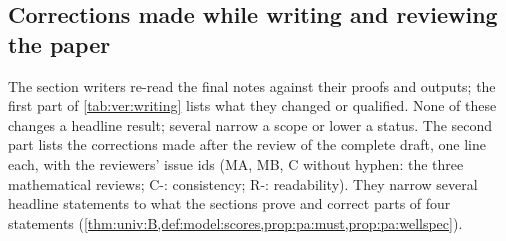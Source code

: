 \subsection{Corrections made while writing and reviewing the paper}\label{app:ver:writing}

The section writers re-read the final notes against their proofs and outputs; the first part of \cref{tab:ver:writing} lists what they changed or qualified. None of these changes a headline result; several narrow a scope or lower a status. The second part lists the corrections made after the review of the complete draft, one line each, with the reviewers' issue ids (MA, MB, C without hyphen: the three mathematical reviews; C-: consistency; R-: readability). They narrow several headline statements to what the sections prove and correct parts of four statements (\cref{thm:univ:B,def:model:scores,prop:pa:must,prop:pa:wellspec}).

